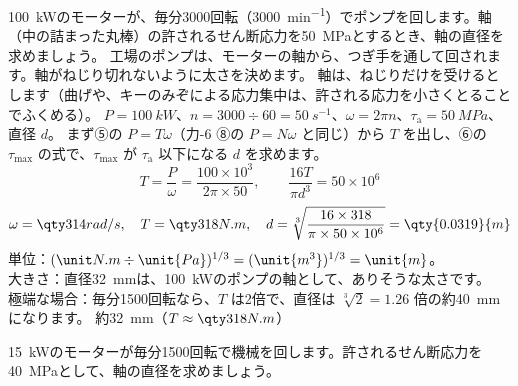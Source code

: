 \begin{phreidai}[ポンプを回す軸の太さ]
\label{ph:力-11:ex6}\qty{100}{kW}のモーターが、毎分3000回転（\qty{3000}{min^{-1}}）でポンプを回します。軸（中の詰まった丸棒）の許されるせん断応力を\qty{50}{MPa}とするとき、軸の直径を求めましょう。
\phbamen
工場のポンプは、モーターの軸から、つぎ手を通して回されます。軸がねじり切れないように太さを決めます。
\phmushi
軸は、ねじりだけを受けるとします（曲げや、キーのみぞによる応力集中は、許される応力を小さくとることでふくめる）。
\phzu
$P=\qty{100}{kW}$、$n=3000\div60=\qty{50}{s^{-1}}$、$\omega=2\pi n$、$\tau_{\mathrm a}=\qty{50}{MPa}$、直径 $d$。
\phriyu
まず⑤の $P=T\omega$（力-6 ⑧の $P=N\omega$ と同じ）から $T$ を出し、⑥の $\tau_{\max}$ の式で、$\tau_{\max}$ が $\tau_{\mathrm a}$ 以下になる $d$ を求めます。
\phtateru
\[ T=\frac{P}{\omega}=\frac{100\times10^3}{2\pi\times50},\qquad \frac{16T}{\pi d^3}=50\times10^6 \]
\phtoku
\[ \omega=\pxlq{314}{rad/s},\quad T=\pxlq{318}{N.m},\quad d=\sqrt[3]{\frac{16\times318}{\pi\times50\times10^6}}=\qty{0.0319}{m} \]
\phtashikame
単位：$(\pxlu{N.m}\div\unit{Pa})^{1/3}=(\unit{m^3})^{1/3}=\unit{m}$。\\
大きさ：直径\qty{32}{mm}は、\qty{100}{kW}のポンプの軸として、ありそうな太さです。\\
極端な場合：毎分1500回転なら、$T$ は2倍で、直径は $\sqrt[3]{2}=1.26$ 倍の約\qty{40}{mm}になります。
\kotae 約\qty{32}{mm}（$T\approx\pxlq{318}{N.m}$）
\end{phreidai}
\begin{jibun}
\qty{15}{kW}のモーターが毎分1500回転で機械を回します。許されるせん断応力を\qty{40}{MPa}として、軸の直径を求めましょう。
\end{jibun}

